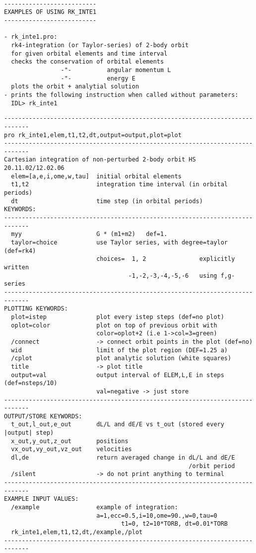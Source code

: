 \documentclass[a4paper,12pt]{article}
\begin{document}
\scriptsize



\small
\begin{verbatim}

--------------------------
EXAMPLES OF USING RK_INTE1
--------------------------

- rk_inte1.pro:
  rk4-integration (or Taylor-series) of 2-body orbit
  for given orbital elements and time interval 
  checks the conservation of orbital elements
                -"-          angular momentum L
                -"-          energy E
  plots the orbit + analytial solution
- prints the following instruction when called without parameters:
  IDL> rk_inte1

\end{verbatim}
\scriptsize
\begin{verbatim}
-----------------------------------------------------------------------------
pro rk_inte1,elem,t1,t2,dt,output=output,plot=plot
-----------------------------------------------------------------------------
Cartesian integration of non-perturbed 2-body orbit HS 20.11.02/12.02.06
  elem=[a,e,i,ome,w,tau]  initial orbital elements
  t1,t2                   integration time interval (in orbital periods)
  dt                      time step (in orbital periods)
KEYWORDS:
-----------------------------------------------------------------------------
  myy                     G * (m1+m2)   def=1.
  taylor=choice           use Taylor series, with degree=taylor (def=rk4)
                          choices=  1, 2               explicitly written                   
                                   -1,-2,-3,-4,-5,-6   using f,g-series
-----------------------------------------------------------------------------
PLOTTING KEYWORDS:
  plot=istep              plot every istep steps (def=no plot)
  oplot=color             plot on top of previous orbit with
                          color=oplot+2 (i.e 1->col=3=green)
  /connect                -> connect orbit points in the plot (def=no)
  wid                     limit of the plot region (DEF=1.25 a)
  /cplot                  plot analytic solution (white squares)
  title                   -> plot title
  output=val              output interval of ELEM,L,E in steps (def=nsteps/10)
                          val=negative -> just store
-----------------------------------------------------------------------------
OUTPUT/STORE KEYWORDS:
  t_out,l_out,e_out       dL/L and dE/E vs t_out (stored every |output| step)
  x_out,y_out,z_out       positions
  vx_out,vy_out,vz_out    velocities
  dl,de                   return averaged change in dL/L and dE/E
                                                    /orbit period
  /silent                 -> do not print anything to terminal
-----------------------------------------------------------------------------
EXAMPLE INPUT VALUES:
  /example                example of integration:
                          a=1,ecc=0.5,i=10,ome=90.,w=0,tau=0
                                 t1=0, t2=10*TORB, dt=0.01*TORB
  rk_inte1,elem,t1,t2,dt,/example,/plot
-----------------------------------------------------------------------------
\end{verbatim}
\end{document}
